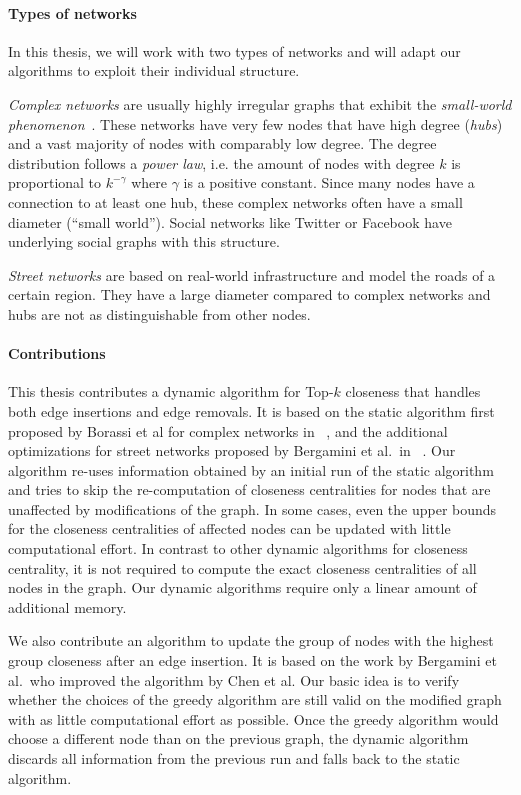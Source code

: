 \paragraph{Types of networks}

In this thesis, we will work with two types of networks and will adapt our algorithms to exploit their individual structure. 

\emph{Complex networks} are usually highly irregular graphs that exhibit the \emph{small-world phenomenon}~\cite{wang2003complex}. These networks have very few nodes that have high degree (\emph{hubs}) and a vast majority of nodes with comparably low degree. The degree distribution follows a \emph{power law}, i.e. the amount of nodes with degree $k$ is proportional to $k^{-\gamma}$ where $\gamma$ is a positive constant. Since many nodes have a connection to at least one hub, these complex networks often have a small diameter (``small world''). Social networks like Twitter or Facebook have underlying social graphs with this structure.

\emph{Street networks} are based on real-world infrastructure and model the roads of a certain region. They have a large diameter compared to complex networks and hubs are not as distinguishable from other nodes.


\paragraph{Contributions}
This thesis contributes a dynamic algorithm for Top-$k$ closeness that handles both edge insertions and edge removals. It is based on the static algorithm first proposed by Borassi et al for complex networks in ~\cite{borassi2015fast}, and the additional optimizations for street networks proposed by Bergamini et al.\ in ~\cite{bergamini2016computing}. Our algorithm re-uses information obtained by an initial run of the static algorithm and tries to skip the re-computation of closeness centralities for nodes that are unaffected by modifications of the graph. In some cases, even the upper bounds for the closeness centralities of affected nodes can be updated with little computational effort. In contrast to other dynamic algorithms for closeness centrality, it is not required to compute the exact closeness centralities of all nodes in the graph. Our dynamic algorithms require only a linear amount of additional memory.

We also contribute an algorithm to update the group of nodes with the highest group closeness after an edge insertion. It is based on the work by Bergamini et al.\ who improved the algorithm by Chen et al. Our basic idea is to verify whether the choices of the greedy algorithm are still valid on the modified graph with as little computational effort as possible. Once the greedy algorithm would choose a different node than on the previous graph, the dynamic algorithm discards all information from the previous run and falls back to the static algorithm.

